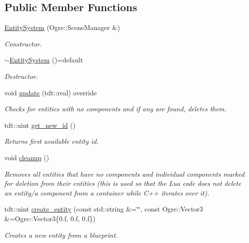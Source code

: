 \subsection*{Public Member Functions}
\begin{DoxyCompactItemize}
\item 
\hyperlink{class_entity_system_a2bf6f7d3c7b6b7e02c8cc3dd454e9ab1}{Entity\+System} (Ogre\+::\+Scene\+Manager \&)
\begin{DoxyCompactList}\small\item\em Constructor. \end{DoxyCompactList}\item 
\hyperlink{class_entity_system_a8b34e0963a5231a3cda81442771318fb}{$\sim$\+Entity\+System} ()=default
\begin{DoxyCompactList}\small\item\em Destructor. \end{DoxyCompactList}\item 
void \hyperlink{class_entity_system_aa51808181d7c66baea07cec41c17b4cd}{update} (tdt\+::real) override
\begin{DoxyCompactList}\small\item\em Checks for entities with no components and if any are found, deletes them. \end{DoxyCompactList}\item 
tdt\+::uint \hyperlink{class_entity_system_adfb0a9adc4f2d4273d6cbf69d948f23c}{get\+\_\+new\+\_\+id} ()
\begin{DoxyCompactList}\small\item\em Returns first available entity id. \end{DoxyCompactList}\item 
void \hyperlink{class_entity_system_acf6c4ffcec1a74b1f3db6636489a7217}{cleanup} ()
\begin{DoxyCompactList}\small\item\em Removes all entities that have no components and individual components marked for deletion from their entities (this is used so that the Lua code does not delete an entity/a component from a container while C++ iterates over it). \end{DoxyCompactList}\item 
tdt\+::uint \hyperlink{class_entity_system_ac283fa8ea0e3755ad2b267010a7fd6c2}{create\+\_\+entity} (const std\+::string \&=\char`\"{}\char`\"{}, const Ogre\+::\+Vector3 \&=Ogre\+::\+Vector3\{0.f, 0.f, 0.f\})
\begin{DoxyCompactList}\small\item\em Creates a new entity from a blueprint. \end{DoxyCompactList}\item 

\end{DoxyCompactItemize}
